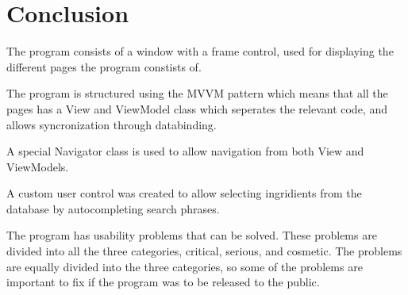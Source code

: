 \chapter{Conclusion}
The program consists of a window with a frame control, used for displaying the different pages the program constists of.

The program is structured using the MVVM pattern which means that all the pages has a View and ViewModel class which seperates the relevant code, and allows syncronization through databinding.

A special Navigator class is used to allow navigation from both View and ViewModels.

A custom user control was created to allow selecting ingridients from the database by autocompleting search phrases.

The program has usability problems that can be solved. These problems are divided into all the three categories, critical, serious, and cosmetic. The problems are equally divided into the three categories, so some of the problems are important to fix if the program was to be released to the public.